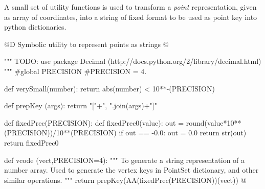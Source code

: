 \documentclass[11pt,oneside]{article}    %
\begin{document}
A small set of utility functions is used to transform a \emph{point} representation, given as array of coordinates, into a string of fixed format to be used as point key into python dictionaries.

@D Symbolic utility to represent points as strings
@{""" TODO: use package Decimal (http://docs.python.org/2/library/decimal.html) """
#global PRECISION
#PRECISION = 4.

def verySmall(number): return abs(number) < 10**-(PRECISION)

def prepKey (args): return "["+", ".join(args)+"]"

def fixedPrec(PRECISION):
    def fixedPrec0(value):
        out = round(value*10**(PRECISION))/10**(PRECISION)
        if out == -0.0: out = 0.0
        return str(out)
    return fixedPrec0
    
def vcode (vect,PRECISION=4): 
    """
    To generate a string representation of a number array.
    Used to generate the vertex keys in PointSet dictionary, and other similar operations.
    """
    return prepKey(AA(fixedPrec(PRECISION))(vect))
@}




\end{document}
